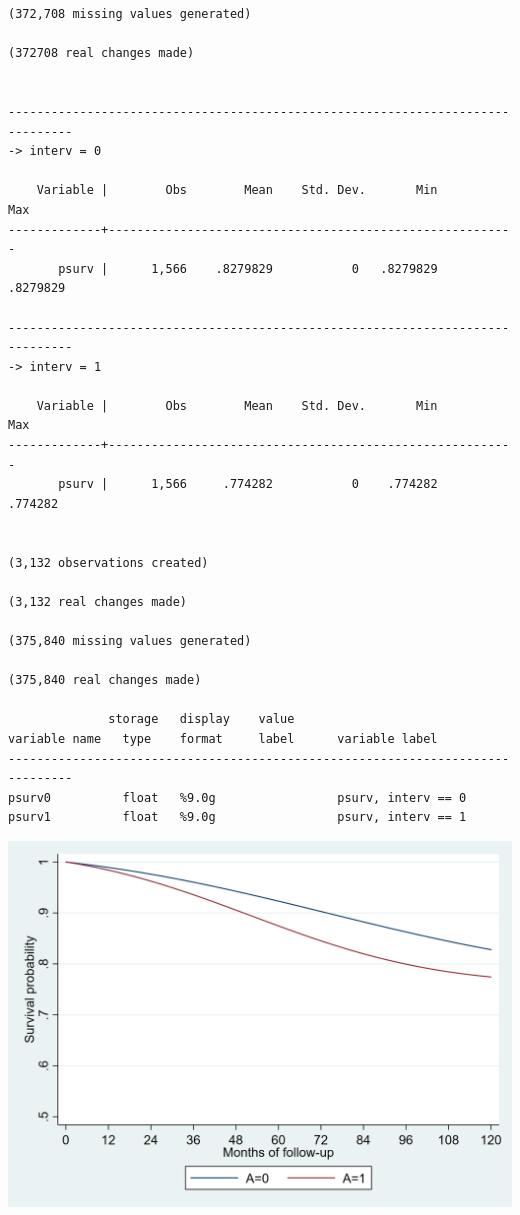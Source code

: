 \documentclass[
  10pt,
]{book}
\begin{document}
\begin{verbatim}
(372,708 missing values generated)

(372708 real changes made)


-------------------------------------------------------------------------------
-> interv = 0

    Variable |        Obs        Mean    Std. Dev.       Min        Max
-------------+---------------------------------------------------------
       psurv |      1,566    .8279829           0   .8279829   .8279829

-------------------------------------------------------------------------------
-> interv = 1

    Variable |        Obs        Mean    Std. Dev.       Min        Max
-------------+---------------------------------------------------------
       psurv |      1,566     .774282           0    .774282    .774282


(3,132 observations created)

(3,132 real changes made)

(375,840 missing values generated)

(375,840 real changes made)

              storage   display    value
variable name   type    format     label      variable label
-------------------------------------------------------------------------------
psurv0          float   %9.0g                 psurv, interv == 0
psurv1          float   %9.0g                 psurv, interv == 1
\end{verbatim}

\begin{center}\includegraphics[width=0.85\linewidth]{./figs/stata-fig-17-2} \end{center}
\end{document}
